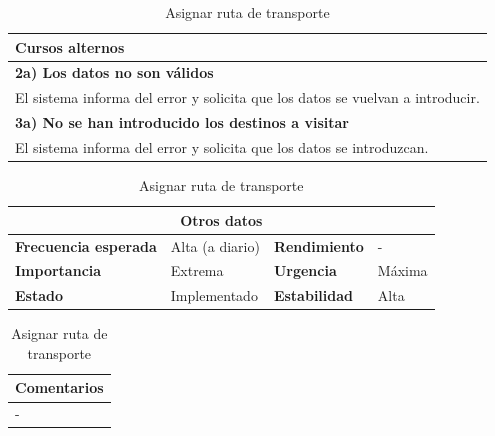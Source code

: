 \documentclass[12pt,spanish]{article}
\begin{document}
\begin{table}[H]
\vspace{1cm}

\begin{tabular}{|m{10pt}|m{7.15cm}|m{10pt}|m{7.15cm}|}
\hline
\multicolumn{4}{|m{16.2cm}|}{\textbf{Cursos alternos}} \\
\hline
\multicolumn{4}{|m{16.2cm}|}{\textbf{2a) Los datos no son válidos}} \\
\hline
\multicolumn{4}{|m{16.2cm}|}{El sistema informa del error y solicita que los datos se vuelvan a introducir.} \\
\hline
\multicolumn{4}{|m{16.2cm}|}{\textbf{3a) No se han introducido los destinos a visitar}} \\
\hline
\multicolumn{4}{|m{16.2cm}|}{El sistema informa del error y solicita que los datos se introduzcan.} \\
\hline
\end{tabular}

\vspace{1cm}

\begin{tabular}{|m{3.72cm}|m{3.72cm}|m{3.72cm}|m{3.72cm}|}
\hline
\multicolumn{4}{|c|}{\textbf{Otros datos}} \\
\hline
\textbf{Frecuencia esperada} & Alta (a diario) & \textbf{Rendimiento} & - \\
\hline
\textbf{Importancia} & Extrema & \textbf{Urgencia} & Máxima \\
\hline
\textbf{Estado} & Implementado & \textbf{Estabilidad} & Alta \\
\hline
\end{tabular}

\vspace{1cm}

\begin{tabular}{|m{16.2cm}|}
\hline
\textbf{Comentarios} \\
\hline
- \\
\hline
\end{tabular}

\caption{Asignar ruta de transporte}

\end{table}


\end{document}
